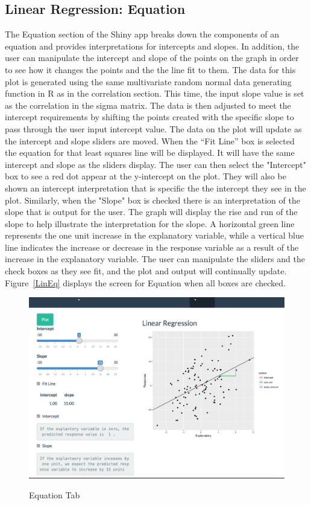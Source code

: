 \documentclass[11pt]{book}
\begin{document}
\subsection{Linear Regression: Equation}

The Equation section of the Shiny app breaks down the components of an equation and provides interpretations for intercepts and slopes.  In addition, the user can manipulate the intercept and slope of the points on the graph in order to see how it changes the points and the the line fit to them.  The data for this plot is generated using the same multivariate random normal data generating function in R as in the correlation section. This time, the input slope value is set as the correlation in the sigma matrix. The data is then adjusted to meet the intercept requirements by shifting the points created with the specific slope to pass through the user input intercept value. The data on the plot will update as the intercept and slope sliders are moved.  When the  ``Fit Line'' box is selected the equation for that least squares line will be displayed. It will have the same intercept and slope as the sliders display. The user can then select the "Intercept" box to see a red dot appear at the y-intercept on the plot. They will also be shown an intercept interpretation that is specific the the intercept they see in the plot. Similarly, when the "Slope" box is checked there is an interpretation of the slope that is output for the user.  The graph will display the rise and run of the slope to help illustrate the interpretation for the slope. A horizontal green line represents the one unit increase in the explanatory variable, while a vertical blue line indicates the increase or decrease in the response variable as a result of the increase in the explanatory variable. The user can manipulate the sliders and the check boxes as they see fit, and the plot and output will continually update. Figure~\ref{LinEq} displays the screen for Equation when all boxes are checked. 

\begin{figure}[H]
\centering
      \includegraphics[width=\textwidth]{LinEq.png}
      \label{fig: LinEq}
      \caption{Equation Tab}
\end{figure}
\end{document}

